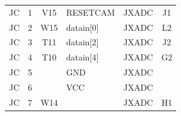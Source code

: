 \documentclass[../main.tex]{subfiles}%
\begin{document}
\begin{table}[h]
\begin{tabular}{ccclcc}
\rowcolor[HTML]{C0E6F5} 
JC                                             & 1                                        & V15                                      & RESETCAM                               & JXADC                                                                                    & J1                                                                                    \\
JC                                             & 2                                        & W15                                      & datain{[}0{]}                          & JXADC                                                                                    & L2                                                                                    \\
\rowcolor[HTML]{C0E6F5} 
JC                                             & 3                                        & T11                                      & datain{[}2{]}                          & JXADC                                                                                    & J2                                                                                    \\
JC                                             & 4                                        & T10                                      & datain{[}4{]}                          & JXADC                                                                                    & G2                                                                                    \\
\rowcolor[HTML]{C0E6F5} 
JC                                             & 5                                        &                                          & GND                                    & JXADC                                                                                    &                                                                                       \\
JC                                             & 6                                        &                                          & VCC                                    & JXADC                                                                                    & \multicolumn{1}{l}{}                                                                  \\
\rowcolor[HTML]{C0E6F5} 
JC                                             & 7                                        & W14                                      &                                        & JXADC                                                                                    & H1                                                                                    \\

\end{tabular}
\end{table}
\end{document}
